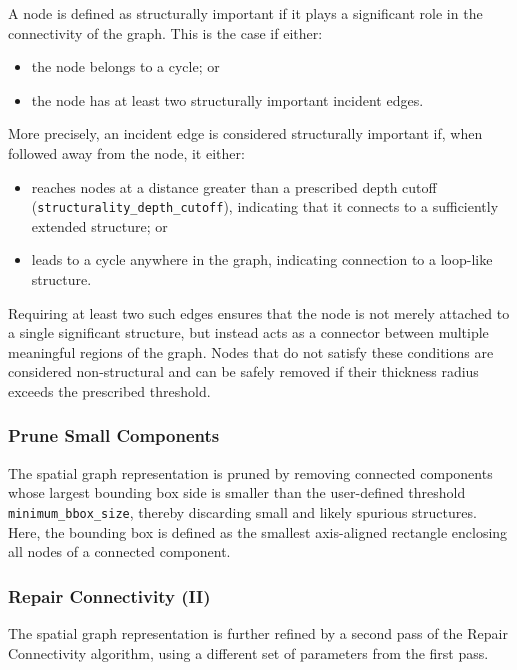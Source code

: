 \documentclass[english,12pt,a4paper]{article}
\begin{document}
	A node is defined as structurally important if it plays a significant role in the connectivity of the graph. This is the case if either:
	\begin{itemize}
		\item the node belongs to a cycle; or
		\item the node has at least two structurally important incident edges.
	\end{itemize}
	
	More precisely, an incident edge is considered structurally important if, when followed away from the node, it either:
	\begin{itemize}
		\item reaches nodes at a distance greater than a prescribed depth cutoff (\texttt{structurality\_depth\_cutoff}), indicating that it connects to a sufficiently extended structure; or
		\item leads to a cycle anywhere in the graph, indicating connection to a loop-like structure.
	\end{itemize}
	
	Requiring at least two such edges ensures that the node is not merely attached to a single significant structure, but instead acts as a connector between multiple meaningful regions of the graph. Nodes that do not satisfy these conditions are considered non-structural and can be safely removed if their thickness radius exceeds the prescribed threshold.
	
	\subsubsection{Prune Small Components}
	
	The spatial graph representation is pruned by removing connected components whose largest bounding box side is smaller than the user-defined threshold \texttt{minimum\_bbox\_size}, thereby discarding small and likely spurious structures. Here, the bounding box is defined as the smallest axis-aligned rectangle enclosing all nodes of a connected component.
	
	\subsubsection{Repair Connectivity (II)}
	
	The spatial graph representation is further refined by a second pass of the Repair Connectivity algorithm, using a different set of parameters from the first pass.
	
\end{document}
